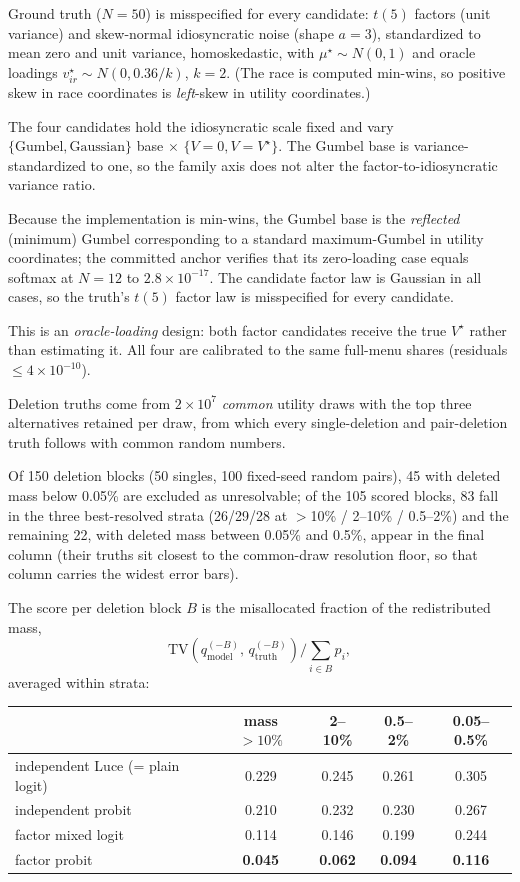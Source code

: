 \documentclass[12pt]{article}
\theoremstyle{remark}
\begin{document}
Ground truth ($N = 50$) is misspecified for every candidate: $t(5)$ factors
(unit variance) and skew-normal idiosyncratic noise (shape $a = 3$),
standardized to mean zero and unit variance, homoskedastic, with $\mu^\star
\sim N(0,1)$ and oracle loadings $v^\star_{ir} \sim N(0, 0.36/k)$, $k=2$.
(The race is computed min-wins, so positive skew in race coordinates is
\emph{left}-skew in utility coordinates.)

The four candidates hold the idiosyncratic scale fixed and vary
$\{\text{Gumbel}, \text{Gaussian}\}$ base $\times$ $\{V = 0, V =
V^\star\}$. The Gumbel base is variance-standardized to one, so the
family axis does not alter the factor-to-idiosyncratic variance ratio.

Because the implementation is min-wins, the Gumbel base is the
\emph{reflected} (minimum) Gumbel corresponding to a standard
maximum-Gumbel in utility coordinates; the committed anchor verifies that
its zero-loading case equals softmax at $N=12$ to $2.8\times10^{-17}$.
The candidate factor law is Gaussian in all cases, so the truth's $t(5)$
factor law is misspecified for every candidate.

This is an \emph{oracle-loading} design: both factor
candidates receive the true $V^\star$ rather than estimating it. All four
are calibrated to the same full-menu shares (residuals $\le
4\times10^{-10}$).

Deletion truths come from $2\times10^7$ \emph{common} utility draws with
the top three alternatives retained per draw, from which every
single-deletion and pair-deletion truth follows with common random numbers.

Of 150 deletion blocks (50 singles, 100 fixed-seed random pairs), 45 with
deleted mass below 0.05\% are excluded as unresolvable; of the 105 scored
blocks, 83 fall in the three best-resolved strata (26/29/28 at $>$10\% /
2--10\% / 0.5--2\%) and the remaining 22, with deleted mass between
0.05\% and 0.5\%, appear in the final column (their truths sit closest to
the common-draw resolution floor, so that column carries the widest error
bars).

The score per deletion block $B$ is the
misallocated fraction of the redistributed mass,
\[
\mathrm{TV}\!\left(q^{(-B)}_{\mathrm{model}},\,
q^{(-B)}_{\mathrm{truth}}\right) \Big/ \textstyle\sum_{i \in B} p_i ,
\]
averaged within strata:

\begin{center}
\begin{tabular}{lcccc}
\toprule
 & mass $>10\%$ & 2--10\% & 0.5--2\% & 0.05--0.5\% \\
\midrule
independent Luce (= plain logit) & 0.229 & 0.245 & 0.261 & 0.305 \\
independent probit & 0.210 & 0.232 & 0.230 & 0.267 \\
factor mixed logit & 0.114 & 0.146 & 0.199 & 0.244 \\
factor probit & \textbf{0.045} & \textbf{0.062} & \textbf{0.094} & \textbf{0.116} \\
\bottomrule
\end{tabular}
\end{center}
\end{document}
